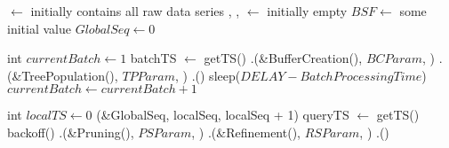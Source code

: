 \begin{algorithm}[htbp]
    \footnotesize
    \vspace*{2mm}
    
    \begin{algorithmic}[1]
    
        \State \BC $\gets$ initially contains all raw data series
        \State \TP, \PS, \RS $\gets$ initially empty
        \State $\mathit{BSF} \gets$ some initial value
        \State $\mathit{GlobalSeq} \gets 0$
    \EndProcedure
    
    \vspace*{1mm}
    \vspace*{1mm}
    
      \label{alg:IndexCreation}
        \State int $\mathit{currentBatch} \gets 1$
                \State batchTS $\gets$ getTS()
            \EndIf
            \State \BC.\Traverse(\&BufferCreation(), $\mathit{BCParam}$, \False)
            \State \TP.\Traverse(\&TreePopulation(), $\mathit{TPParam}$, \False)
            \State \TP.\Clean() \label{alg:reuse}
                \State sleep($\mathit{DELAY}-\mathit{BatchProcessingTime}$)
            \EndIf
            \State $\mathit{currentBatch} \gets \mathit{currentBatch} + 1$
        \EndWhile
    \EndProcedure
    
    \vspace*{1mm}
    
     \label{alg:QueryAnswering}
        \State int $\mathit{localTS} \gets 0$
                    \State \CAS(\&GlobalSeq, localSeq, localSeq + 1)
                \EndIf
                \State queryTS $\gets$ getTS()
                    \State backoff()
                \EndWhile
            \EndIf
            \State \PS.\Traverse(\&Pruning(), $\mathit{PSParam}$, \False)
            \State \RS.\Traverse(\&Refinement(), $\mathit{RSParam}$, \False)
            \State \RS.\Clean() \label{alg:reuseRS}
            

\end{algorithmic}
\end{algorithm}

